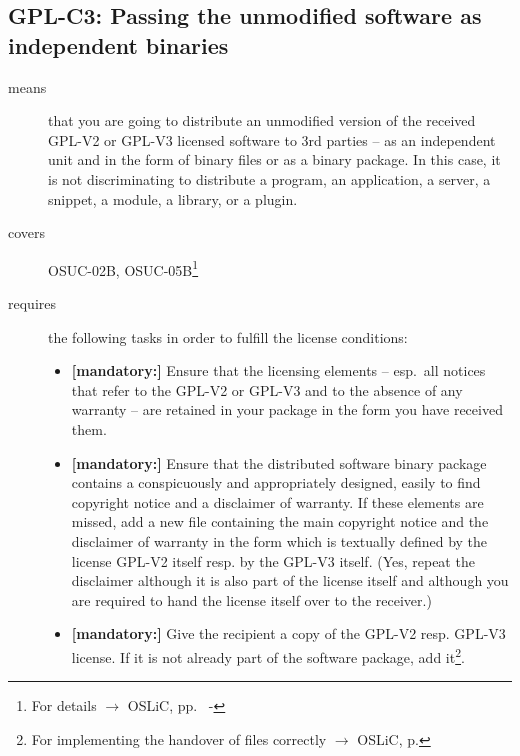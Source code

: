 \subsection{GPL-C3: Passing the unmodified software as independent binaries} 
\label{OSUC-02B-GPL} \label{OSUC-05B-GPL}

\begin{description}


\item[means] that you are going to distribute an unmodified version of the
received GPL-V2 or GPL-V3 licensed software to 3rd parties -- as an independent
unit and in the form of binary files or as a binary package. In this case, it is
not discriminating to distribute a program, an application, a server, a snippet,
a module, a library, or a plugin.


\item[covers] OSUC-02B, OSUC-05B\footnote{For details $\rightarrow$ OSLiC, pp.\
\pageref{OSUC-02B-DEF} - \pageref{OSUC-05B-DEF}}

\item[requires] the following tasks in order to fulfill the license conditions:
\begin{itemize}
  
  \item \textbf{[mandatory:]} Ensure that the licensing elements -- esp.\ all
  notices that refer to the GPL-V2 or GPL-V3 and to the absence of any
  warranty -- are retained in your package in the form you have received them.

  \item \textbf{[mandatory:]} Ensure that the distributed software binary
  package contains a conspicuously and appropriately designed, easily to find
  copyright notice and a disclaimer of warranty. If these elements are missed,
  add a new file containing the main copyright notice and the disclaimer of
  warranty in the form which is textually defined by the license GPL-V2 itself
  resp. by the GPL-V3 itself. (Yes, repeat the disclaimer although it is also
  part of the license itself and although you are required to hand the license
  itself over to the receiver.)
  
  \item \textbf{[mandatory:]} Give the recipient a copy of the GPL-V2 resp.
  GPL-V3 license. If it is not already part of the software package, add
  it\footnote{For implementing the handover of files correctly $\rightarrow$
  OSLiC, p. \pageref{DistributingFilesHint}}.
  

\end{itemize}
\end{description}
